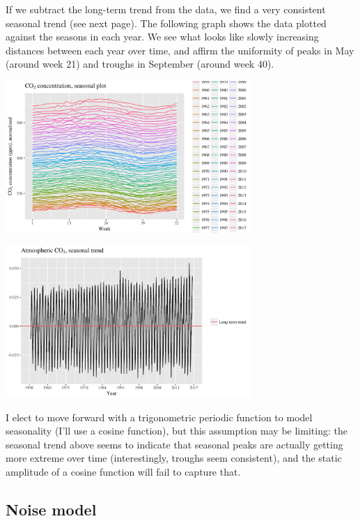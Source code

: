 \documentclass[]{article}
\let\origfigure=\figure
\let\endorigfigure=\endfigure
\renewenvironment{figure}[1][]{%
  \origfigure[H]
}{%
  \endorigfigure
}
\begin{document}
If we subtract the long-term trend from the data, we find a very
consistent seasonal trend (see next page). The following graph shows the
data plotted against the seasons in each year. We see what looks like
slowly increasing distances between each year over time, and affirm the
uniformity of peaks in May (around week 21) and troughs in September
(around week 40). \newline

\begin{figure}
\centering
\includegraphics[width=0.7\textwidth]{mauna_loa/seasonal_plot.png}
\caption{Seasonal trend, by year}
\end{figure}

\begin{figure}
\centering
\includegraphics[width=0.7\textwidth]{mauna_loa/seasonal_trend.png}
\caption{Seasonal trend, over years}
\end{figure}

I elect to move forward with a trigonometric periodic function to model
seasonality (I'll use a cosine function), but this assumption may be
limiting: the seasonal trend above seems to indicate that seasonal peaks
are actually getting more extreme over time (interestingly, troughs seem
consistent), and the static amplitude of a cosine function will fail to
capture that.\newline

\hypertarget{noise-model}{%
\subsection{Noise model}\label{noise-model}}
\end{document}
